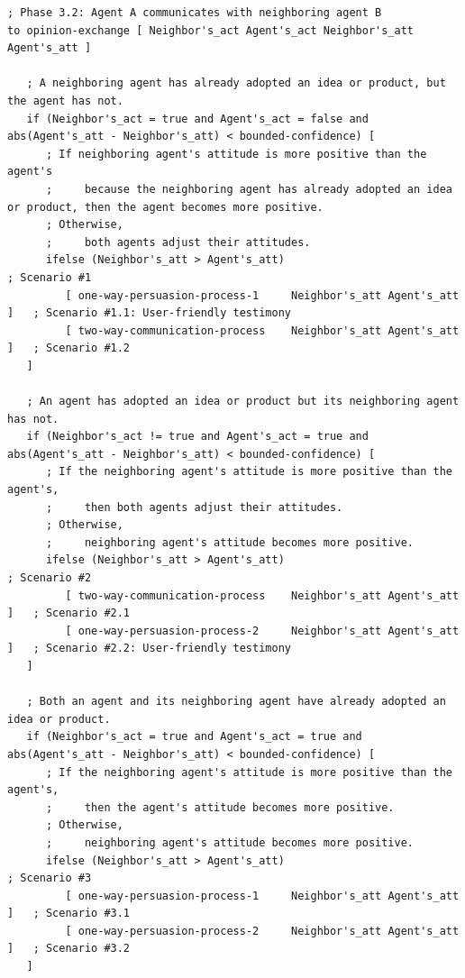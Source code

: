 \documentclass[10pt,letterpaper]{article}
\begin{document}
\begin{algorithm}[!ht]
\caption{\textbf{NetLogo-style pseudo-code for opinion exchange and adoption decision making.}}
\label{alg3}
\begin{lstlisting}[basicstyle=\ttfamily\fontsize{6.2pt}{7.2pt}\selectfont]
; Phase 3.2: Agent A communicates with neighboring agent B
to opinion-exchange [ Neighbor's_act Agent's_act Neighbor's_att Agent's_att ]

   ; A neighboring agent has already adopted an idea or product, but the agent has not.
   if (Neighbor's_act = true and Agent's_act = false and abs(Agent's_att - Neighbor's_att) < bounded-confidence) [
      ; If neighboring agent's attitude is more positive than the agent's
      ;     because the neighboring agent has already adopted an idea or product, then the agent becomes more positive.
      ; Otherwise,
      ;     both agents adjust their attitudes.
      ifelse (Neighbor's_att > Agent's_att)                                ; Scenario #1
         [ one-way-persuasion-process-1     Neighbor's_att Agent's_att ]   ; Scenario #1.1: User-friendly testimony
         [ two-way-communication-process    Neighbor's_att Agent's_att ]   ; Scenario #1.2
   ]

   ; An agent has adopted an idea or product but its neighboring agent has not.
   if (Neighbor's_act != true and Agent's_act = true and abs(Agent's_att - Neighbor's_att) < bounded-confidence) [
      ; If the neighboring agent's attitude is more positive than the agent's,
      ;     then both agents adjust their attitudes.
      ; Otherwise,
      ;     neighboring agent's attitude becomes more positive.
      ifelse (Neighbor's_att > Agent's_att)                                ; Scenario #2
         [ two-way-communication-process    Neighbor's_att Agent's_att ]   ; Scenario #2.1
         [ one-way-persuasion-process-2     Neighbor's_att Agent's_att ]   ; Scenario #2.2: User-friendly testimony
   ]

   ; Both an agent and its neighboring agent have already adopted an idea or product.
   if (Neighbor's_act = true and Agent's_act = true and abs(Agent's_att - Neighbor's_att) < bounded-confidence) [
      ; If the neighboring agent's attitude is more positive than the agent's,
      ;     then the agent's attitude becomes more positive.
      ; Otherwise,
      ;     neighboring agent's attitude becomes more positive.
      ifelse (Neighbor's_att > Agent's_att)                                ; Scenario #3
         [ one-way-persuasion-process-1     Neighbor's_att Agent's_att ]   ; Scenario #3.1
         [ one-way-persuasion-process-2     Neighbor's_att Agent's_att ]   ; Scenario #3.2
   ]


\end{lstlisting}
\end{algorithm}
\end{document}
